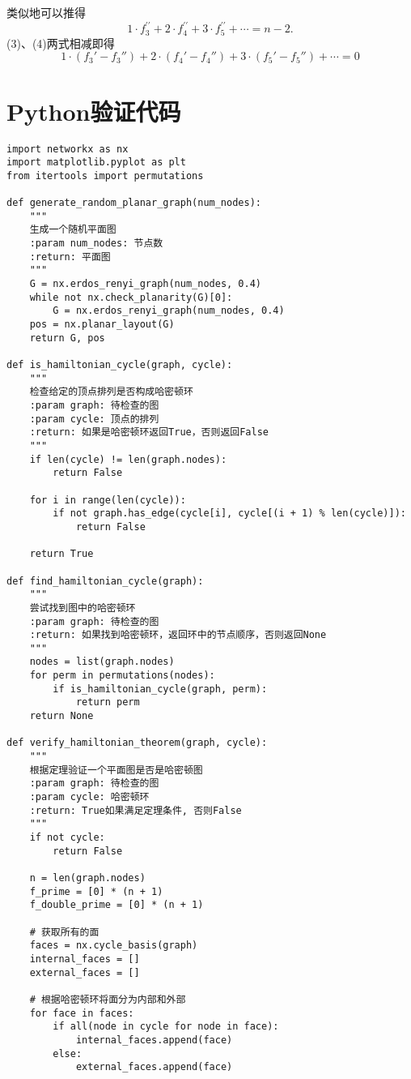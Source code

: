 \documentclass{article}
\begin{document}
类似地可以推得
$$
1 \cdot f_3^{\prime \prime}+2 \cdot f_4^{\prime \prime}+3 \cdot f_5^{\prime \prime}+\cdots=n-2 .
$$
(3)、(4)两式相减即得
\[ 1 \cdot \left( f_3' - f_3'' \right) + 2 \cdot \left( f_4' - f_4'' \right) + 3 \cdot \left( f_5' - f_5'' \right) + \cdots = 0 \]
\section{Python验证代码}
\begin{lstlisting}
import networkx as nx
import matplotlib.pyplot as plt
from itertools import permutations

def generate_random_planar_graph(num_nodes):
    """
    生成一个随机平面图
    :param num_nodes: 节点数
    :return: 平面图
    """
    G = nx.erdos_renyi_graph(num_nodes, 0.4)
    while not nx.check_planarity(G)[0]:
        G = nx.erdos_renyi_graph(num_nodes, 0.4)
    pos = nx.planar_layout(G)
    return G, pos

def is_hamiltonian_cycle(graph, cycle):
    """
    检查给定的顶点排列是否构成哈密顿环
    :param graph: 待检查的图
    :param cycle: 顶点的排列
    :return: 如果是哈密顿环返回True，否则返回False
    """
    if len(cycle) != len(graph.nodes):
        return False

    for i in range(len(cycle)):
        if not graph.has_edge(cycle[i], cycle[(i + 1) % len(cycle)]):
            return False

    return True

def find_hamiltonian_cycle(graph):
    """
    尝试找到图中的哈密顿环
    :param graph: 待检查的图
    :return: 如果找到哈密顿环，返回环中的节点顺序，否则返回None
    """
    nodes = list(graph.nodes)
    for perm in permutations(nodes):
        if is_hamiltonian_cycle(graph, perm):
            return perm
    return None

def verify_hamiltonian_theorem(graph, cycle):
    """
    根据定理验证一个平面图是否是哈密顿图
    :param graph: 待检查的图
    :param cycle: 哈密顿环
    :return: True如果满足定理条件, 否则False
    """
    if not cycle:
        return False

    n = len(graph.nodes)
    f_prime = [0] * (n + 1)
    f_double_prime = [0] * (n + 1)

    # 获取所有的面
    faces = nx.cycle_basis(graph)
    internal_faces = []
    external_faces = []

    # 根据哈密顿环将面分为内部和外部
    for face in faces:
        if all(node in cycle for node in face):
            internal_faces.append(face)
        else:
            external_faces.append(face)


\end{lstlisting}
\end{document}
